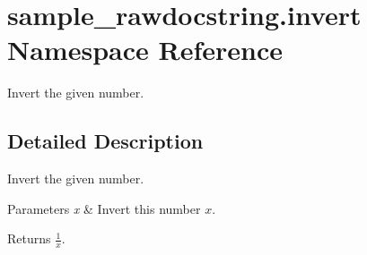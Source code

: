 \hypertarget{namespacesample__rawdocstring_1_1invert}{\section{sample\-\_\-rawdocstring.\-invert Namespace Reference}
\label{namespacesample__rawdocstring_1_1invert}
}


Invert the given number.  




\subsection{Detailed Description}
Invert the given number. 
\begin{DoxyParams}{Parameters}
{\em x} & Invert this number $x$.\\
\hline
\end{DoxyParams}
\begin{DoxyReturn}{Returns}
$\frac{1}{x}$. 
\end{DoxyReturn}
